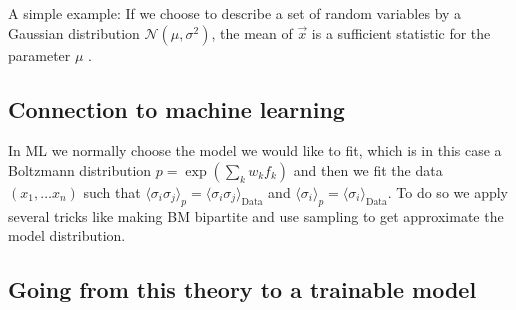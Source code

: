 \documentclass[nofootinbib, superscriptaddress, prl]{revtex4}
\begin{document}
A simple example: If we choose to describe a set of random variables by a Gaussian distribution $\mathcal{N}(\mu, \sigma^2)$, the mean of $\vec{x}$ is a sufficient statistic for the parameter $\mu$ .

\subsection{Connection to machine learning}
In ML we normally choose the model we would like to fit, which is in this case a Boltzmann distribution $p = \exp(\sum_k w_k f_k)$ and then we fit the data $(x_1, \dots x_n)$ such that $\langle \sigma_i \sigma_j \rangle_p = \langle \sigma_i \sigma_j \rangle_{\text{Data}}$ and $\langle \sigma_i \rangle_p = \langle \sigma_i  \rangle_{\text{Data}}$. To do so we apply several tricks like making BM bipartite and use sampling to get approximate the model distribution.

\subsection{Going from this theory to a trainable model}
\end{document}
